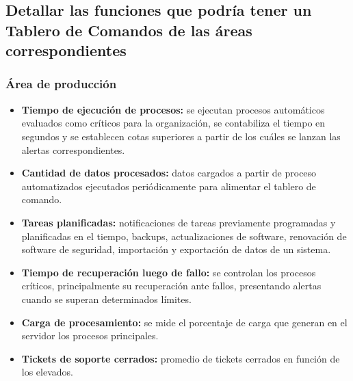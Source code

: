 \begin{itemize}
\begin{itemize}
                \end{itemize}
            \end{itemize}   

            
            
            
\newpage
    \subsection{Detallar las funciones que podría tener un Tablero de Comandos de las áreas correspondientes} %
    
    \subsubsection{Área de producción}
    	\begin{itemize}
			\item\textbf{Tiempo de ejecución de procesos:} se ejecutan procesos automáticos evaluados como críticos para la organización, se contabiliza el tiempo en segundos y se establecen cotas superiores a partir de los cuáles se lanzan las alertas correspondientes.
            \item\textbf{Cantidad de datos procesados:} datos cargados a partir de proceso automatizados ejecutados periódicamente para alimentar el tablero de comando.
            \item\textbf{Tareas planificadas:} notificaciones de tareas previamente programadas y planificadas en el tiempo, backups, actualizaciones de software, renovación de software de seguridad, importación y exportación de datos de un sistema.
            \item\textbf{Tiempo de recuperación luego de fallo:} se controlan los procesos críticos, principalmente su recuperación ante fallos, presentando alertas cuando se superan determinados límites.
            \item \textbf{Carga de procesamiento: }se mide el porcentaje de carga que generan en el servidor los procesos principales.
            \item \textbf{Tickets de soporte cerrados: }promedio de tickets cerrados en función de los elevados.
		\end{itemize}
        
